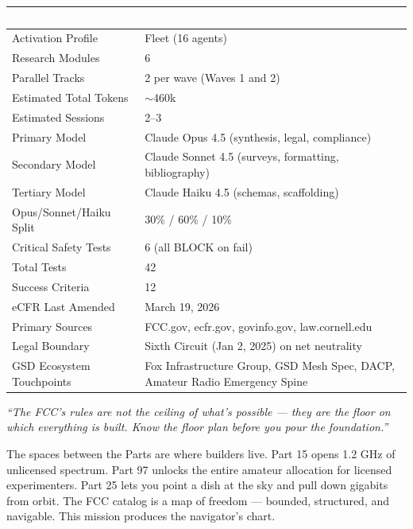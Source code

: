 \documentclass[11pt,letterpaper]{article}
\newcommand{\tableheader}[1]{\textbf{\sffamily\textcolor{white}{#1}}}
\begin{document}
\begin{center}
\begin{tabularx}{\textwidth}{L{5cm}X}
\toprule
{}
\tableheader{Metric} & \tableheader{Value} \\
\midrule
Activation Profile & Fleet (16 agents) \\
Research Modules & 6 \\
Parallel Tracks & 2 per wave (Waves 1 and 2) \\
Estimated Total Tokens & $\sim$460k \\
Estimated Sessions & 2--3 \\
Primary Model & Claude Opus 4.5 (synthesis, legal, compliance) \\
Secondary Model & Claude Sonnet 4.5 (surveys, formatting, bibliography) \\
Tertiary Model & Claude Haiku 4.5 (schemas, scaffolding) \\
Opus/Sonnet/Haiku Split & 30\% / 60\% / 10\% \\
Critical Safety Tests & 6 (all BLOCK on fail) \\
Total Tests & 42 \\
Success Criteria & 12 \\
eCFR Last Amended & March 19, 2026 \\
Primary Sources & FCC.gov, ecfr.gov, govinfo.gov, law.cornell.edu \\
Legal Boundary & Sixth Circuit (Jan 2, 2025) on net neutrality \\
GSD Ecosystem Touchpoints & Fox Infrastructure Group, GSD Mesh Spec, DACP, Amateur Radio Emergency Spine \\
\bottomrule
\end{tabularx}
\end{center}

\vspace{2em}

\begin{quotebox}
\textit{``The FCC's rules are not the ceiling of what's possible --- they are the floor on which everything is built. Know the floor plan before you pour the foundation.''}

\vspace{0.5em}
{\small\sffamily\textcolor{subtlegray}{The spaces between the Parts are where builders live. Part 15 opens 1.2 GHz of unlicensed spectrum. Part 97 unlocks the entire amateur allocation for licensed experimenters. Part 25 lets you point a dish at the sky and pull down gigabits from orbit. The FCC catalog is a map of freedom --- bounded, structured, and navigable. This mission produces the navigator's chart.}}
\end{quotebox}
\end{document}
